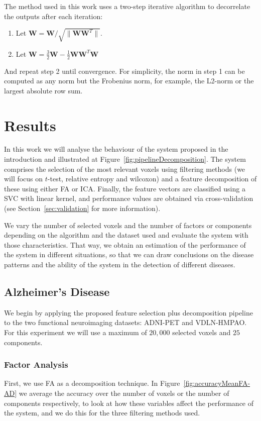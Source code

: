 The method used in this work uses a two-step iterative algorithm \cite{Hyvarinen2000} to decorrelate the outputs after each iteration: 
\begin{enumerate}
	\item Let $\mathbf{W} = \mathbf{W}/\sqrt{\lVert\mathbf{W}\mathbf{W}^T\rVert}$. 
	\item Let $\mathbf{W} = \frac{3}{2} \mathbf{W}-\frac{1}{2} \mathbf{W} \mathbf{W}^T  \mathbf{W}$
\end{enumerate}

And repeat step 2 until convergence. For simplicity, the norm in step 1 can be computed as any norm but the Frobenius norm, for example, the L2-norm or the largest absolute row sum. 

\section{Results}
In this work we will analyse the behaviour of the system proposed in the introduction and illustrated at Figure~\ref{fig:pipelineDecomposition}. The system comprises the selection of the most relevant voxels using filtering methods (we will focus on $t$-test, relative entropy and wilcoxon) and a feature decomposition of these using either \ac{FA} or \ac{ICA}. Finally, the feature vectors are classified using a \ac{SVC} with linear kernel, and performance values are obtained via cross-validation (see Section~\ref{sec:validation} for more information). 

We vary the number of selected voxels and the number of factors or components depending on the algorithm and the dataset used and evaluate the system with those characteristics. That way, we obtain an estimation of the performance of the system in different situations, so that we can draw conclusions on the disease patterns and the ability of the system in the detection of different diseases. 

\subsection{Alzheimer's Disease}
We begin by applying the proposed feature selection plus decomposition pipeline to the two functional neuroimaging datasets: ADNI-PET and VDLN-HMPAO. For this experiment we will use a maximum of $20,000$ selected voxels and $25$ components. 

\subsubsection{Factor Analysis}\label{sec:results_FA_AD}
First, we use \ac{FA} as a decomposition technique. In Figure~\ref{fig:accuracyMeanFA-AD} we average the accuracy over the number of voxels or the number of components respectively, to look at how these variables affect the performance of the system, and we do this for the three filtering methods used. 

